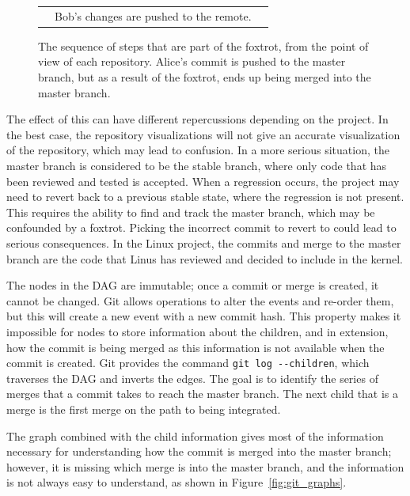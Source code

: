 \begin{figure}[htbp]
\begin{tabulary}{\textwidth}{LLL}
    &
    \tiny{Bob's changes are pushed to the remote.}
    &
    \\
  \end{tabulary}

  \caption{The sequence of steps that are part of the foxtrot, from the
  point of view of each repository. Alice's commit is pushed to the
  master branch, but as a result of the foxtrot, ends up being merged
  into the master branch.}
\label{fig:FoxtrotSteps}
\end{figure}

The effect of this can have different repercussions depending on the
project.
In the best case, the repository visualizations will not give an
accurate visualization of the repository, which may lead to confusion.
In a more serious situation, the master branch is considered to be the
stable branch, where only code that has been reviewed and tested is
accepted.
When a regression occurs, the project may need to revert back to a
previous stable state, where the regression is not present.
This requires the ability to find and track the master branch, which may
be confounded by a foxtrot.
Picking the incorrect commit to revert to could lead to serious
consequences.
In the Linux project, the commits and merge to the master branch are the
code that Linus has reviewed and decided to include in the kernel.

The nodes in the DAG are immutable; once a commit or merge is created,
it cannot be changed. Git allows operations to alter the events and
re-order them, but this will create a new event with a new commit hash.
This property makes it impossible for nodes to store information about
the children, and in extension, how the commit is being merged as this
information is not available when the commit is created.
Git provides the command \verb|git log --children|, which traverses the
DAG and inverts the edges.
The goal is to identify the series of merges that a commit takes to
reach the master branch.
The next child that is a merge is the first merge on the path to being
integrated.

The graph combined with the child information gives most of the
information necessary for understanding how the commit is
merged into the master branch; however, it is missing which merge is
into the master branch, and the information is not always easy to
understand, as shown in Figure~\ref{fig:git_graphs}.

